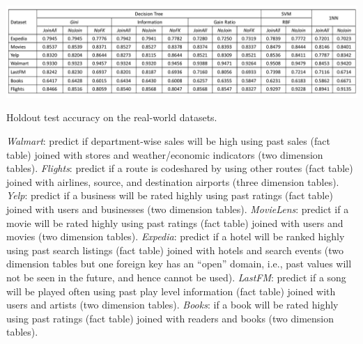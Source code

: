 \documentclass{vldb}
\begin{document}
\begin{table}[t]
\centering
\includegraphics[width=0.99\linewidth]{table2.pdf}
\caption{Holdout test accuracy on the real-world datasets.}
\label{Table:RealTest}
\end{table}

\textit{Walmart}: predict if department-wise sales will be high using past sales (fact table) joined with stores and weather/economic indicators (two dimension tables).
\textit{Flights}: predict if a route is codeshared by using other routes (fact table) joined with airlines, source, and destination airports (three dimension tables).
\textit{Yelp}: predict if a business will be rated highly using past ratings (fact table) joined with users and businesses (two dimension tables).
\textit{MovieLens}: predict if a movie will be rated highly using past ratings (fact table) joined with users and movies (two dimension tables).
\textit{Expedia}: predict if a hotel will be ranked highly using past search listings (fact table) joined with hotels and search events (two dimension tables but one foreign key has an 
``open'' domain, i.e., past values will not be seen in the future, and hence cannot be used).
\textit{LastFM}: predict if a song will be played often using past play level information (fact table) joined with users and artists (two dimension tables).
\textit{Books}: if a book will be rated highly using past ratings (fact table) joined with readers and books (two dimension tables).
\end{document}
